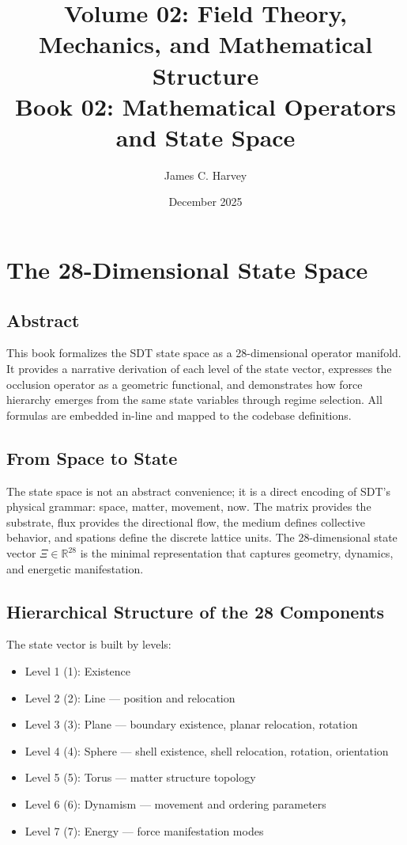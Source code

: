 \documentclass[12pt]{book}
\title{Volume 02: Field Theory, Mechanics, and Mathematical Structure \\ Book 02: Mathematical Operators and State Space}
\author{James C. Harvey}
\date{December 2025}
\begin{document}
\maketitle
\tableofcontents

\chapter{The 28-Dimensional State Space}

\section*{Abstract}
This book formalizes the SDT state space as a 28-dimensional operator manifold. It provides a narrative
derivation of each level of the state vector, expresses the occlusion operator as a geometric functional,
and demonstrates how force hierarchy emerges from the same state variables through regime selection.
All formulas are embedded in-line and mapped to the codebase definitions.

\section{From Space to State}
The state space is not an abstract convenience; it is a direct encoding of SDT’s physical grammar:
space, matter, movement, now. The matrix provides the substrate, flux provides the directional flow,
the medium defines collective behavior, and spations define the discrete lattice units. The 28-dimensional
state vector $\Xi \in \mathbb{R}^{28}$ is the minimal representation that captures geometry, dynamics,
and energetic manifestation.

\section{Hierarchical Structure of the 28 Components}
The state vector is built by levels:
\begin{itemize}
\item Level 1 (1): Existence
\item Level 2 (2): Line — position and relocation
\item Level 3 (3): Plane — boundary existence, planar relocation, rotation
\item Level 4 (4): Sphere — shell existence, shell relocation, rotation, orientation
\item Level 5 (5): Torus — matter structure topology
\item Level 6 (6): Dynamism — movement and ordering parameters
\item Level 7 (7): Energy — force manifestation modes
\end{itemize}
\end{document}

